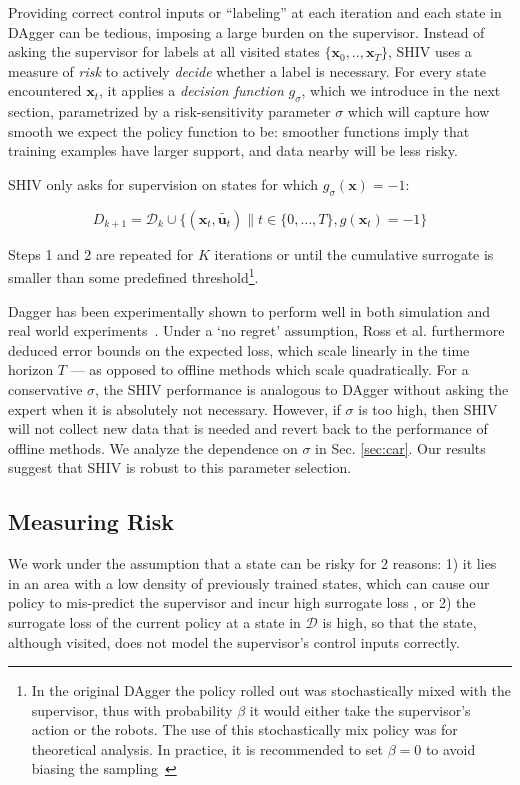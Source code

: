 \documentclass[10pt, conference]{ieeeconf}      %
\newcommand{\bu}{\mathbf{u}}
\newcommand{\bx}{\mathbf{x}}
\begin{document}
Providing correct control inputs or ``labeling'' at each
iteration and each state in DAgger can be tedious, imposing a large burden on the supervisor.
Instead of asking the supervisor for labels at all visited states $\{\bx_0,..,\bx_T\}$, SHIV uses a measure of \emph{risk} to actively \emph{decide} whether a label is necessary. For every state encountered $\bx_t$, it applies a \emph{decision function} $g_{\sigma}$, which we introduce in the next section, parametrized by a risk-sensitivity parameter $\sigma$ which will capture how smooth we expect the policy function to be: smoother functions imply that training examples have larger support, and data nearby will be less risky.

SHIV only asks for supervision on states for which $g_{\sigma}(\bx)=-1$: 


$$D_{k+1}=\mathcal{D}_k \cup \{(\bx_t,\tilde{\bu_t})\|t\in\{0,\ldots,T\},g(\bx_t)=-1\}$$

Steps 1 and 2 are repeated for $K$ iterations or until 
the cumulative surrogate is smaller than some predefined threshold\footnote{In the original DAgger the policy rolled out
was stochastically mixed with the supervisor, thus with probability $\beta$ it would either take the supervisor's action
or the robots. The use of this stochastically mix policy was for theoretical analysis. In practice, it is recommended
to set $\beta = 0$ to avoid biasing the sampling~\cite{NIPS2014_5421,ross2010reduction}}.


Dagger has been experimentally shown to perform well in both simulation and real world
    experiments~\cite{NIPS2014_5421,ross2010reduction,ross2013learning}. Under a `no regret' assumption, Ross et al.\cite{ross2010reduction} furthermore
deduced error bounds on the expected loss, which scale linearly in the time horizon $T$ --- as opposed to offline methods which scale quadratically. For a conservative $\sigma$, the SHIV performance is analogous to DAgger without asking the expert when it is absolutely not necessary. However, if $\sigma$ is too high, then SHIV will not collect new data that is needed and revert back to the performance of offline methods. We analyze the dependence on $\sigma$ in Sec. \ref{sec:car}. Our results suggest that SHIV is robust to this parameter selection. 

\subsection{Measuring Risk}
We work under the assumption that a state can be risky for 2 reasons: 1) it lies in an area with a low density of
previously trained states, which can cause our policy to mis-predict the supervisor and incur high surrogate
loss \cite{tokdar2010importance}, or 2) the surrogate loss of the current policy at a state in $\mathcal{D}$ is high, so that the state, although visited, does
not model the supervisor's control inputs correctly. 
\end{document}
